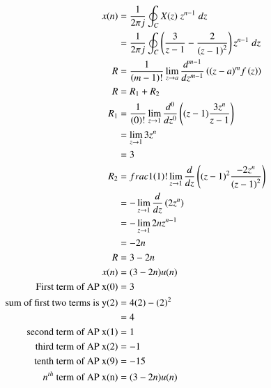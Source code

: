 \documentclass[a4,12pt,onecolumn]{IEEEtran}
\begin{document}
\begin{align}
    x(n)&=\frac{1}{2\pi j}\oint_{C} X(z) \; z^{n-1} \; dz  \\
    &=\frac{1}{2\pi j}\oint_{C}\left(\frac{3}{z-1}-\frac{2}{\left(z-1\right)^2}\right)z^{n-1} \;dz \\
    R&=\frac{1}{\left(m-1\right)!}\lim\limits_{z\to a}\frac{d^{m-1}}{dz^{m-1}}\left({(z-a)}^{m}f\left(z\right)\right)  \\
    R&=R_1+R_2\\
    R_1&=\frac{1}{\left(0\right)!}\lim\limits_{z\to 1}\frac{d^{0}}{dz^{0}}\left({(z-1)}\frac{3z^{n}}{z-1}\right)\\
    &=\lim\limits_{z\to 1}3z^{n}\\
    &=3\\
    R_2&=frac{1}{\left(1\right)!}\lim\limits_{z\to 1}\frac{d}{dz}\left({(z-1)^2}\frac{-2z^{n}}{\left(z-1\right)^2}\right)\\
    &=-\lim\limits_{z\to 1}\frac{d}{dz}\left(2z^{n}\right)\\
    &=-\lim\limits_{z\to 1}2nz^{n-1}\\
    &=-2n\\
    R&= 3-2n\\
    x(n)&=(3-2n)u(n)\\
    \text{First term of AP x(0)} &=3\\
    \text{sum of first two terms is y(2)} &= 4(2) - (2)^2\\
    &=4\\
    \text{second term of AP x(1)}&=1\\
    \text{third term of AP x(2)}&=-1\\
    \text{tenth term of AP x(9)}&=-15\\
    \text{$n^{th}$ term of AP x(n)}&=(3-2n)u(n)
\end{align}
\end{document}
